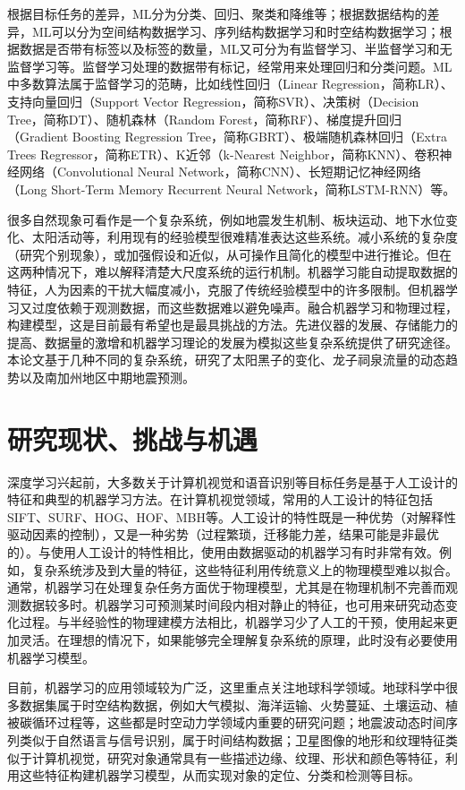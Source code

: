 根据目标任务的差异，ML分为分类、回归、聚类和降维等；根据数据结构的差异，ML可以分为空间结构数据学习、序列结构数据学习和时空结构数据学习；根据数据是否带有标签以及标签的数量，ML又可分为有监督学习、半监督学习和无监督学习等。监督学习处理的数据带有标记，经常用来处理回归和分类问题。ML中多数算法属于监督学习的范畴，比如线性回归（Linear Regression，简称LR）、支持向量回归（Support Vector Regression，简称SVR）、决策树（Decision Tree，简称DT）、随机森林（Random Forest，简称RF）、梯度提升回归（Gradient Boosting Regression Tree，简称GBRT）、极端随机森林回归（Extra Trees Regressor，简称ETR）、K近邻（k-Nearest Neighbor，简称KNN）、卷积神经网络（Convolutional Neural Network，简称CNN）、长短期记忆神经网络（Long Short-Term Memory Recurrent Neural Network，简称LSTM-RNN）等。

很多自然现象可看作是一个复杂系统，例如地震发生机制、板块运动、地下水位变化、太阳活动等，利用现有的经验模型很难精准表达这些系统。减小系统的复杂度（研究个别现象），或加强假设和近似，从可操作且简化的模型中进行推论。但在这两种情况下，难以解释清楚大尺度系统的运行机制。机器学习能自动提取数据的特征，人为因素的干扰大幅度减小，克服了传统经验模型中的许多限制。但机器学习又过度依赖于观测数据，而这些数据难以避免噪声。融合机器学习和物理过程，构建模型，这是目前最有希望也是最具挑战的方法。先进仪器的发展、存储能力的提高、数据量的激增和机器学习理论的发展为模拟这些复杂系统提供了研究途径。本论文基于几种不同的复杂系统，研究了太阳黑子的变化、龙子祠泉流量的动态趋势以及南加州地区中期地震预测。

\section{研究现状、挑战与机遇}\label{sec:intro_veiw}

深度学习兴起前，大多数关于计算机视觉和语音识别等目标任务是基于人工设计的特征和典型的机器学习方法。在计算机视觉领域，常用的人工设计的特征包括SIFT、SURF、HOG、HOF、MBH等。人工设计的特性既是一种优势（对解释性驱动因素的控制），又是一种劣势（过程繁琐，迁移能力差，结果可能是非最优的）。与使用人工设计的特性相比，使用由数据驱动的机器学习有时非常有效。例如，复杂系统涉及到大量的特征，这些特征利用传统意义上的物理模型难以拟合。通常，机器学习在处理复杂任务方面优于物理模型，尤其是在物理机制不完善而观测数据较多时。机器学习可预测某时间段内相对静止的特征，也可用来研究动态变化过程。与半经验性的物理建模方法相比，机器学习少了人工的干预，使用起来更加灵活。在理想的情况下，如果能够完全理解复杂系统的原理，此时没有必要使用机器学习模型。

目前，机器学习的应用领域较为广泛，这里重点关注地球科学领域。地球科学中很多数据集属于时空结构数据，例如大气模拟、海洋运输、火势蔓延、土壤运动、植被碳循环过程等，这些都是时空动力学领域内重要的研究问题\citep{mathieu2015deep,oh2015action}；地震波动态时间序列类似于自然语言与信号识别，属于时间结构数据\citep{perol2018convolutional,devries2018deep,rouet2017machine}；卫星图像的地形和纹理特征类似于计算机视觉，研究对象通常具有一些描述边缘、纹理、形状和颜色等特征，利用这些特征构建机器学习模型，从而实现对象的定位、分类和检测等目标\citep{lee1990neural}。

